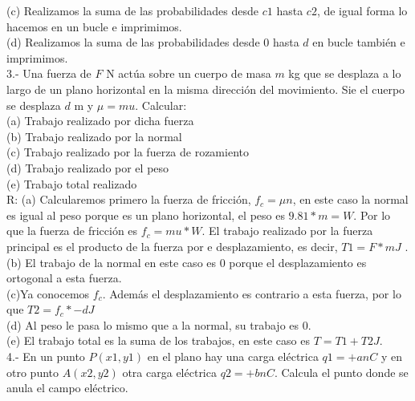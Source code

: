 \documentclass{article}
\begin{document}
(c) Realizamos la suma de las probabilidades desde $c1$ hasta $c2$, de igual forma lo hacemos en un bucle e imprimimos.\\

(d) Realizamos la suma de las probabilidades desde $0$ hasta $d$ en bucle también e imprimimos. \\

3.- Una fuerza de $F$ N actúa sobre un cuerpo de masa $m$ kg que se desplaza a lo largo de un plano horizontal en la misma dirección del movimiento. Sie el cuerpo se desplaza $d$ m y $\mu = mu$. Calcular:\\
(a) Trabajo realizado por dicha fuerza\\
(b) Trabajo realizado por la normal\\
(c) Trabajo realizado por la fuerza de rozamiento\\
(d) Trabajo realizado por el peso\\
(e) Trabajo total realizado\\

R: (a) Calcularemos primero la fuerza de fricción, $f_{c} = \mu n$, en este caso la normal es igual al peso porque es un plano horizontal, el peso es $9.81*m = W$. Por lo que la fuerza de fricción es $f_{c} = mu*W$. El trabajo realizado por la fuerza principal es el producto de la fuerza por e desplazamiento, es decir, $T1 = F*m J$ .\\

(b) El trabajo de la normal en este caso es $0$ porque el desplazamiento es ortogonal a esta fuerza.\\

(c)Ya conocemos $f_{c}$. Además el desplazamiento es contrario a esta fuerza, por lo que $T2 = f_{c}*-d J$\\

(d) Al peso le pasa lo mismo que a la normal, su trabajo es $0$.\\

(e) El trabajo total es la suma de los trabajos, en este caso es $T = T1 + T2 J$.\\

4.- En un punto $P(x1,y1)$ en el plano hay una carga eléctrica $q1 = +a nC$ y en otro punto $A(x2,y2)$ otra carga eléctrica $q2 = +b nC$. Calcula el punto donde se anula el campo eléctrico.\\
\end{document}
